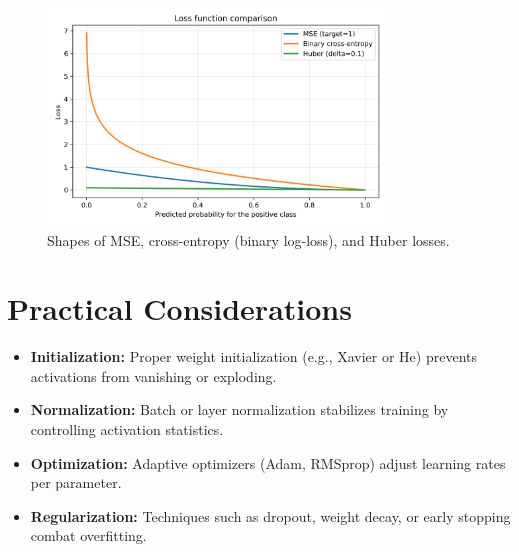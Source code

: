 ﻿\documentclass{article}
\begin{document}
\begin{figure}[H]
  \centering
  \includegraphics[width=0.8\textwidth]{loss_functions.png}
  \caption{Shapes of MSE, cross-entropy (binary log-loss), and Huber losses.}
  \label{fig:loss_functions}
\end{figure}
\FloatBarrier

\section{Practical Considerations}
\begin{itemize}
  \item \textbf{Initialization:} Proper weight initialization (e.g., Xavier or He) prevents activations from vanishing or exploding.
  \item \textbf{Normalization:} Batch or layer normalization stabilizes training by controlling activation statistics.
  \item \textbf{Optimization:} Adaptive optimizers (Adam, RMSprop) adjust learning rates per parameter.
  \item \textbf{Regularization:} Techniques such as dropout, weight decay, or early stopping combat overfitting.
\end{itemize}
\end{document}
